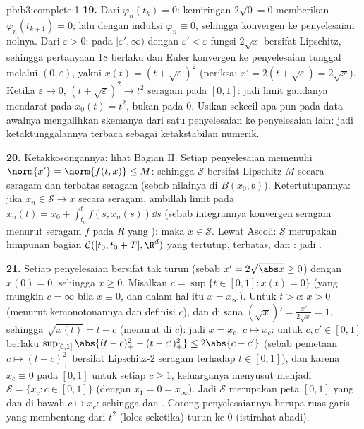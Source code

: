 \begin{solution}{pb:b3:complete:1}
\textbf{19.} Dari $\varphi_n(t_k) = 0$: kemiringan $2\sqrt0 =
0$ memberikan $\varphi_n(t_{k+1}) = 0$; lalu dengan induksi $\varphi_n
\equiv 0$, sehingga konvergen ke penyelesaian nolnya. Dari
$\varepsilon > 0$: pada $[\varepsilon', \infty)$ dengan
$\varepsilon' < \varepsilon$ fungsi $2\sqrt x$ bersifat
Lipschitz, sehingga pertanyaan 18 berlaku dan Euler konvergen ke
penyelesaian tunggal melalui $(0, \varepsilon)$, yakni $x(t) =
(t + \sqrt\varepsilon)^2$ (periksa: $x' = 2(t + \sqrt
\varepsilon) = 2\sqrt x$). Ketika $\varepsilon \to 0$, $(t +
\sqrt\varepsilon)^2 \to t^2$ seragam pada $[0,1]$: jadi limit
gandanya mendarat pada $x_0(t) = t^2$, bukan pada $0$. Usikan
sekecil apa pun pada data awalnya mengalihkan skemanya
dari satu penyelesaian ke penyelesaian lain: jadi ketaktunggalannya terbaca sebagai
ketakstabilan numerik.

\textbf{20.} Ketakkosongannya: lihat Bagian II. Setiap penyelesaian memenuhi
$\norm{x'} = \norm{f(t, x)} \leq M$: sehingga $\mathcal S$ bersifat
Lipschitz-$M$ secara seragam dan terbatas seragam (sebab nilainya di
$\bar B(x_0, b)$). Ketertutupannya: jika $x_n \in \mathcal S \to x$
secara seragam, ambillah limit pada $x_n(t) = x_0 +
\int_{t_0}^tf(s, x_n(s))\dd s$ (sebab integrannya konvergen
seragam menurut  seragam $f$ pada $R$ yang ):
maka $x \in \mathcal S$. Lewat Ascoli: $\mathcal S$ merupakan himpunan bagian
$\mathcal C([t_0, t_0+T], \R^d)$ yang tertutup, terbatas, dan : jadi .

\textbf{21.} Setiap penyelesaian bersifat tak turun (sebab $x' = 2\sqrt{\abs
x} \geq 0$) dengan $x(0) = 0$, sehingga $x \geq 0$. Misalkan $c =
\sup\{t \in [0,1] : x(t) = 0\}$ (yang mungkin $c = \infty$ bila
$x \equiv 0$, dan dalam hal itu $x = x_\infty$). Untuk $t > c$: $x
> 0$ (menurut kemonotonannya dan definisi $c$), dan di sana $(\sqrt
x)' = \frac{x'}{2\sqrt x} = 1$, sehingga $\sqrt{x(t)} = t - c$
(menurut  di $c$): jadi $x = x_c$.  $c \mapsto
x_c$: untuk $c, c' \in [0, 1]$ berlaku $\sup_{[0,1]}\abs{(t - c)_+^2 -
(t - c')_+^2} \leq 2\abs{c - c'}$ (sebab pemetaan $c \mapsto
(t-c)_+^2$ bersifat Lipschitz-$2$ seragam terhadap $t \in [0,1]$), dan
karena $x_c \equiv 0$ pada $[0,1]$ untuk setiap $c \geq 1$, keluarganya
menyusut menjadi $\mathcal S = \{x_c : c \in [0,1]\}$ (dengan
$x_1 = 0 = x_\infty$). Jadi $\mathcal S$ merupakan peta
$[0,1]$ yang  dan  di bawah  $c
\mapsto x_c$: sehingga  dan . Corong penyelesaiannya
berupa ruas garis  yang membentang dari $t^2$ (lolos
seketika) turun ke $0$ (istirahat abadi).


\end{solution}
